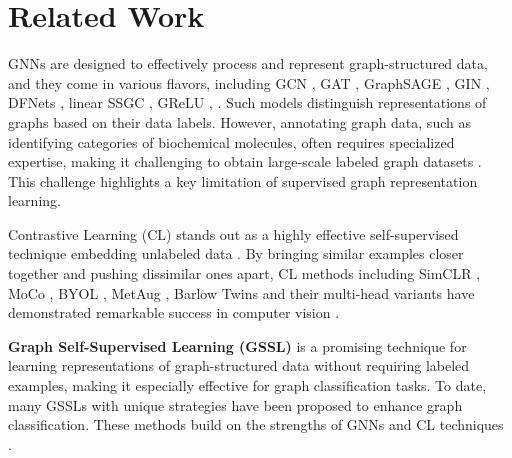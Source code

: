 \section{Related Work}
\label{sec:background}
GNNs are designed to effectively process and represent graph-structured data, and they come in various flavors, including GCN \cite{kipf2016semi}, GAT \cite{velivckovic2018graph}, GraphSAGE \cite{hamilton2017inductive}, GIN \cite{xu2018powerful}, DFNets \cite{wijesinghe2019dfnets}, linear SSGC \cite{zhu2021simple}, GReLU \cite{zhang2022graph}, \etc. Such models distinguish representations of graphs based on their data labels. However, annotating graph data, such as identifying categories of biochemical molecules, often requires specialized expertise, making it challenging to obtain large-scale labeled graph datasets \cite{you2020graph}. This challenge highlights a key limitation of supervised graph representation learning.

Contrastive Learning (CL) stands out as a highly effective self-supervised technique embedding unlabeled data \cite{li2022metamask}. By bringing similar examples closer together and pushing dissimilar ones apart, CL methods including SimCLR \cite{chen2020simple}, MoCo \cite{he2020momentum}, BYOL \cite{grill2020bootstrap}, MetAug \cite{li2022metaug}, Barlow Twins \cite{zbontar2021barlow} and their multi-head variants \cite{multihead_lei} have demonstrated remarkable success in  computer vision \cite{wu2018unsupervised, qiang2022interventional}.

\vspace{0.1cm}
\noindent
\textbf{Graph Self-Supervised Learning (GSSL)} %
is a promising technique for learning representations of graph-structured data without requiring labeled examples, making it especially effective for graph classification tasks. To date, many GSSLs with unique strategies have been proposed to enhance  graph classification. These methods build on the strengths of GNNs and CL techniques \cite{velickovic2019deep, suninfograph, hassani2020contrastive}.

